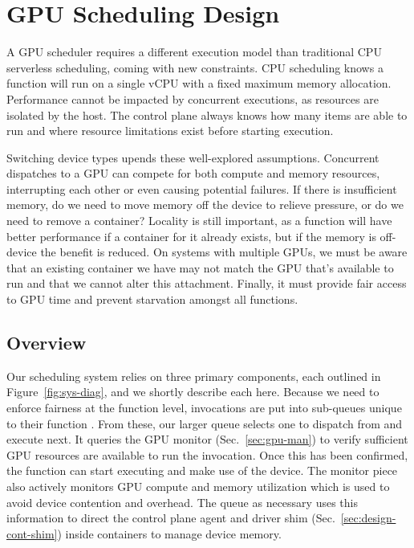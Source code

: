 \section{GPU Scheduling Design}
\label{sec:design}

A GPU scheduler requires a different execution model than traditional CPU serverless scheduling, coming with new constraints.
CPU scheduling knows a function will run on a single vCPU with a fixed maximum memory allocation.
Performance cannot be impacted by concurrent executions, as resources are isolated by the host.
The control plane always knows how many items are able to run and where resource limitations exist before starting execution.

Switching device types upends these well-explored assumptions.
Concurrent dispatches to a GPU can compete for both compute and memory resources, interrupting each other or even causing potential failures.
If there is insufficient memory, do we need to move memory off the device to relieve pressure, or do we need to remove a container?
Locality is still important, as a function will have better performance if a container for it already exists, but if the memory is off-device the benefit is reduced.  
On systems with multiple GPUs, we must be aware that an existing container we have may not match the GPU that's available to run and that we cannot alter this attachment.
Finally, it must provide fair access to GPU time and prevent starvation amongst all functions.


\subsection{Overview}

Our scheduling system relies on three primary components, each outlined in Figure~\ref{fig:sys-diag}, and we shortly describe each here.
Because we need to enforce fairness at the function level, invocations are put into sub-queues unique to their function .
From these, our larger queue selects one to dispatch from  and execute next.
It queries the GPU monitor  (Sec.~\ref{sec:gpu-man}) to verify sufficient GPU resources are available to run the invocation.
Once this has been confirmed, the function can start executing and make use of the device.
The monitor piece also actively monitors GPU compute and memory utilization  which is used to avoid device contention and overhead.
The queue as necessary uses this information to direct the control plane agent and driver shim  (Sec.~\ref{sec:design-cont-shim}) inside containers to manage device memory.


